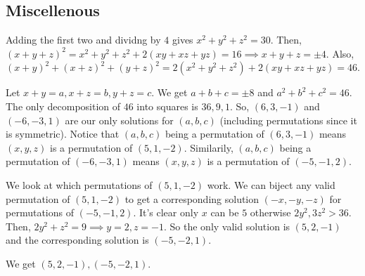 \documentclass[11pt]{article}
\begin{document}
\subsection{Miscellenous}

\begin{sol} 
Adding the first two and dividng by $4$ gives $x^2+y^2+z^2=30$. Then, $(x+y+z)^2=x^2+y^2+z^2+2(xy+xz+yz)=16\implies x+y+z=\pm 4$. Also, $(x+y)^2+(x+z)^2+(y+z)^2=2(x^2+y^2+z^2)+2(xy+xz+yz)=46$. 

Let $x+y=a, x+z=b, y+z=c$. We get $a+b+c=\pm 8$ and $a^2+b^2+c^2=46$. The only decomposition of $46$ into squares is $36,9,1$. So, $(6,3,-1)$ and $(-6,-3,1)$ are our only solutions for $(a,b,c)$ (including permutations since it is symmetric). Notice that $(a,b,c)$ being a permutation of $(6,3,-1)$ means $(x,y,z)$ is a permutation of $(5,1,-2)$. Similarily, $(a,b,c)$ being a permutation of $(-6,-3,1)$ means $(x,y,z)$ is a permutation of $(-5,-1,2)$.

We look at which permutations of $(5,1,-2)$ work. We can biject any valid permutation of $(5,1,-2)$ to get a corresponding solution $(-x,-y,-z)$ for permutations of $(-5,-1,2)$. It's clear only $x$ can be $5$ otherwise $2y^2,3z^2>36$. Then, $2y^2+z^2=9\implies y=2,z=-1$. So the only valid solution is $(5,2,-1)$ and the corresponding solution is $(-5,-2,1)$.

We get $\boxed{(5,2,-1),(-5,-2,1)}$.
\end{sol}




\end{document}
